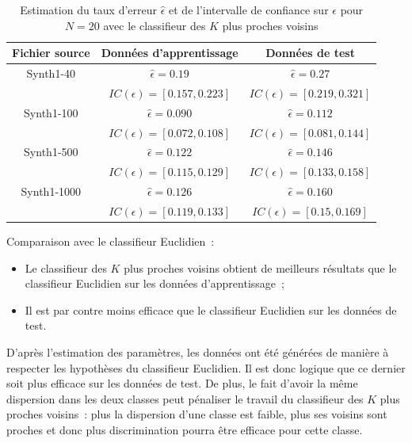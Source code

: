 \documentclass[a4paper,10pt]{report}
\begin{document}
\begin{table}[H]
	\centering
	\captionsetup{justification=centering, margin=4cm}
	\begin{tabular}{c|c|c}
		Fichier source & Données d'apprentissage & Données de test \\ 
		\hline
		\small Synth1-40 & $ \hat{\epsilon} = 0.19 $  &  $ \hat{\epsilon} = 0.27 $ \\
		&  $ IC(\epsilon) = [ 0.157 , 0.223 ] $  & $ IC(\epsilon) = [ 0.219 , 0.321 ] $ \\ 
		\hline
		\small Synth1-100 & $ \hat{\epsilon} = 0.090 $  &  $ \hat{\epsilon} = 0.112 $ \\
		&  $ IC(\epsilon) = [ 0.072 , 0.108 ] $  & $ IC(\epsilon) = [ 0.081 , 0.144 ] $ \\ 
		\hline
		\small Synth1-500 & $ \hat{\epsilon} = 0.122 $  &  $ \hat{\epsilon} = 0.146 $ \\
		&  $ IC(\epsilon) = [ 0.115 , 0.129 ] $  & $ IC(\epsilon) = [ 0.133 , 0.158 ] $ \\ 
		\hline
		\small Synth1-1000 & $ \hat{\epsilon} = 0.126 $  &  $ \hat{\epsilon} = 0.160 $ \\
		&  $ IC(\epsilon) = [ 0.119 , 0.133 ] $  & $ IC(\epsilon) = [ 0.15 , 0.169 ] $ \\ 
	\end{tabular}
	\caption{\small Estimation du taux d'erreur $\hat{\epsilon}$ et de l'intervalle de confiance sur $\epsilon$ pour $N = 20$ avec le classifieur des $K$ plus proches voisins}
	\label{table:1-2-error-rate-Synth1-N-20-kppv}
\end{table}



Comparaison avec le classifieur Euclidien~:
\begin{itemize}
	\item Le classifieur des $K$ plus proches voisins obtient de meilleurs résultats que le classifieur Euclidien sur les données d'apprentissage~;
	\item Il est par contre moins efficace que le classifieur Euclidien sur les données de test.
\end{itemize}

D'après l'estimation des paramètres, les données ont été générées de manière à respecter les hypothèses du classifieur Euclidien. Il est donc logique que ce dernier soit plus efficace sur les données de test. De plus, le fait d'avoir la même dispersion dans les deux classes peut pénaliser le travail du classifieur des $K$ plus proches voisins~: plus la dispersion d'une classe est faible, plus ses voisins sont proches et donc plus discrimination pourra être efficace pour cette classe.
\end{document}
